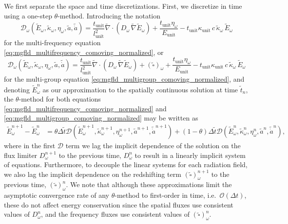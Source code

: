 \documentclass[10pt]{article}
\renewcommand{\(}{\left(}
\renewcommand{\)}{\right)}
\newcommand{\adot}{\dot{a}}
\newcommand{\dt}{\Delta t}
\newcommand{\mD}{{\mathcal D}}
\newcommand{\Lunit}{l_{\text{unit}}}
\newcommand{\Tunit}{t_{\text{unit}}}
\newcommand{\Eunit}{E_{\text{unit}}}
\newcommand{\Kunit}{\kappa_{\text{unit}}}
\newcommand{\tK}{\tilde{\kappa}}
\newcommand{\tT}{\tilde{t}}
\newcommand{\tE}{\tilde{E}}
\newcommand{\tA}{\tilde{a}}
\newcommand{\tAdot}{\tilde{\adot}}
\newcommand{\tnabla}{\tilde{\nabla}}
\begin{document}
We first separate the space and time discretizations.  First, we
discretize in time using a one-step $\theta$-method.  Introducing the
notation 
\[
   \mD_{\omega}(\tE_{\omega},\tK_{\omega},\eta_{\omega},\tA,\tAdot) = 
   \frac{\Tunit}{\Lunit^2}\tnabla\cdot\(D_{\omega}\,\tnabla \tE_{\omega}\)
    + \frac{\Tunit\eta_{\omega}}{\Eunit} 
    - \Tunit \Kunit\, c\, \tK_{\omega}\, \tE_{\omega}
\]
for the multi-frequency equation
\eqref{eq:mgfld_multifrequency_comoving_normalized}, or 
\[
   \mD_{\omega}(\tE_{\omega},\tK_{\omega},\eta_{\omega},\tA,\tAdot) = 
   \frac{\Tunit}{\Lunit^2}\tnabla\cdot\(D_{\omega}\,\tnabla \tE_{\omega}\)
    + (\tilde{\square})_{\omega}
    + \frac{\Tunit\eta_{\omega}}{\Eunit} 
    - \Tunit \Kunit\, c\, \tK_{\omega}\, \tE_{\omega}
\]
for the multi-group equation \eqref{eq:mgfld_multigroup_comoving_normalized},
and denoting $\tE_{\omega}^n$ as our approximation to the spatially continuous
solution at time $\tT_{n}$, the $\theta$-method for both equations
\eqref{eq:mgfld_multifrequency_comoving_normalized} and
\eqref{eq:mgfld_multigroup_comoving_normalized} may be written as
\begin{align}
  \label{eq:mgfld_theta}
  \tE_{\omega}^{n+1} - \tE_{\omega}^n &= 
    \theta\Delta \tT \mD(\tE_{\omega}^{n+1},\tK_{\omega}^{n+1},\eta_{\omega}^{n+1},\tA^{n+1},\tAdot^{n+1}) 
    + (1-\theta)\Delta \tT \mD(\tE_{\omega}^n,\tK_{\omega}^n,\eta_{\omega}^n,\tA^n,\tAdot^n),
\end{align}
where in the first $\mD$ term we lag the implicit dependence of the
solution on the flux limiter $D_{\omega}^{n+1}$ to the previous time, $D_{\omega}^n$ to
result in a linearly implicit system of equations.  Furthermore, to
decouple the linear systems for each radiation field, we also lag
the implicit dependence on the redshifting term
$(\tilde{\square})_{\omega}^{n+1}$ to the previous time,
$(\tilde{\square})_{\omega}^{n}$.  We note that although these
approximations limit the asymptotic convergence rate of any
$\theta$-method to first-order in time, i.e.~$\mathcal O(\dt)$, these
do not affect energy conservation since the spatial fluxes use
consistent values of $D_{\omega}^n$, and the frequency fluxes use
consistent values of $(\tilde{\square})_{\omega}^{n}$.
\end{document}
